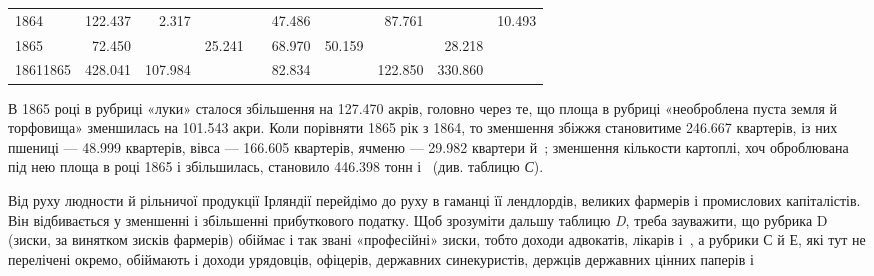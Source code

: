 \begin{table}[H]
\begin{tabularx}{\textwidth}{X*{9}{r}}
    1864 & \num{122.437} & \phantom{00}\num{2.317} & \textemdash{} & \textemdash{} & \num{47.486} & \textemdash{} & \phantom{0}\num{87.761} & \textemdash{} & \num{10.493} \\
    
    1865 & \phantom{0}\num{72.450} & \textemdash{} & \num{25.241} & \textemdash{} & \num{68.970} & \num{50.159} & \textemdash{} & \phantom{0}\num{28.218} & \textemdash{} \\
    
    1861\textendash{}1865 & \num{428.041} & \num{107.984} & \textemdash{} & \textemdash{} & \num{82.834} & \textemdash{} & \num{122.850} & \num{330.860} & \textemdash{} \\
  \end{tabularx}
\end{table}

\setlength{\tabcolsep}{\tabcolsepdef}

\noindent{}В 1865 році в рубриці «луки» сталося збільшення на \num{127.470} акрів,
головно через те, що площа в рубриці «необроблена пуста
земля й торфовища» зменшилась на \num{101.543} акри. Коли порівняти
1865 рік з 1864, то зменшення збіжжя становитиме \num{246.667}
квартерів, із них пшениці — \num{48.999} квартерів, вівса — \num{166.605} квартерів,
ячменю — \num{29.982} квартери й~; зменшення кількости
картоплі, хоч оброблювана під нею площа в році 1865 і збільшилась,
становило \num{446.398} тонн і~ (див. таблицю \emph{С}).

Від руху людности й рільничої продукції Ірляндії перейдімо
до руху в гаманці її лендлордів, великих фармерів і промислових
капіталістів. Він відбивається у зменшенні і збільшенні прибуткового
податку. Щоб зрозуміти дальшу таблицю \emph{D}, треба зауважити,
що рубрика D (зиски, за винятком зисків фармерів) обіймає
і так звані «професійні» зиски, тобто доходи адвокатів,
лікарів і~, а рубрики С й Е, які тут не перелічені окремо,
обіймають і доходи урядовців, офіцерів, державних синекуристів,
держців державних цінних паперів і~
